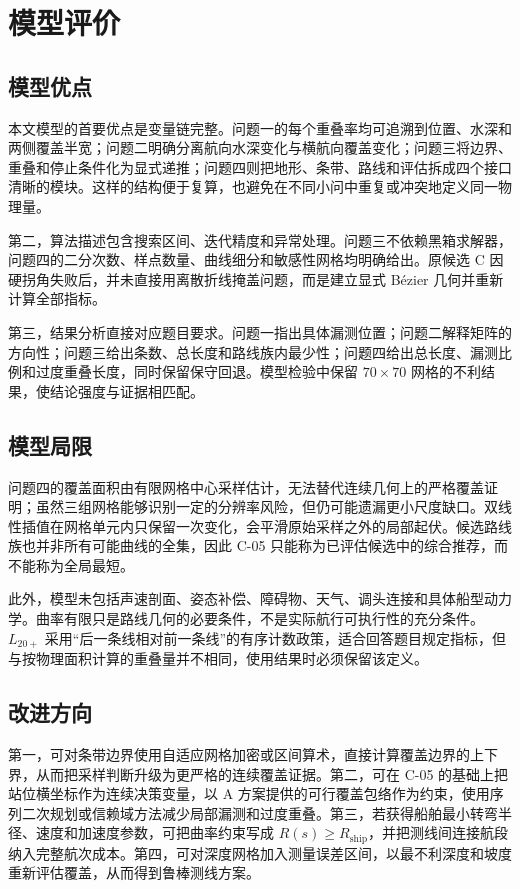 \section{模型评价}
\subsection{模型优点}
本文模型的首要优点是变量链完整。问题一的每个重叠率均可追溯到位置、水深和两侧覆盖半宽；问题二明确分离航向水深变化与横航向覆盖变化；问题三将边界、重叠和停止条件化为显式递推；问题四则把地形、条带、路线和评估拆成四个接口清晰的模块。这样的结构便于复算，也避免在不同小问中重复或冲突地定义同一物理量。

第二，算法描述包含搜索区间、迭代精度和异常处理。问题三不依赖黑箱求解器，问题四的二分次数、样点数量、曲线细分和敏感性网格均明确给出。原候选 C 因硬拐角失败后，并未直接用离散折线掩盖问题，而是建立显式 Bézier 几何并重新计算全部指标。

第三，结果分析直接对应题目要求。问题一指出具体漏测位置；问题二解释矩阵的方向性；问题三给出条数、总长度和路线族内最少性；问题四给出总长度、漏测比例和过度重叠长度，同时保留保守回退。模型检验中保留 $70\times70$ 网格的不利结果，使结论强度与证据相匹配。

\subsection{模型局限}
问题四的覆盖面积由有限网格中心采样估计，无法替代连续几何上的严格覆盖证明；虽然三组网格能够识别一定的分辨率风险，但仍可能遗漏更小尺度缺口。双线性插值在网格单元内只保留一次变化，会平滑原始采样之外的局部起伏。候选路线族也并非所有可能曲线的全集，因此 C-05 只能称为已评估候选中的综合推荐，而不能称为全局最短。

此外，模型未包括声速剖面、姿态补偿、障碍物、天气、调头连接和具体船型动力学。曲率有限只是路线几何的必要条件，不是实际航行可执行性的充分条件。$L_{20+}$ 采用“后一条线相对前一条线”的有序计数政策，适合回答题目规定指标，但与按物理面积计算的重叠量并不相同，使用结果时必须保留该定义。

\subsection{改进方向}
第一，可对条带边界使用自适应网格加密或区间算术，直接计算覆盖边界的上下界，从而把采样判断升级为更严格的连续覆盖证据。第二，可在 C-05 的基础上把站位横坐标作为连续决策变量，以 A 方案提供的可行覆盖包络作为约束，使用序列二次规划或信赖域方法减少局部漏测和过度重叠。第三，若获得船舶最小转弯半径、速度和加速度参数，可把曲率约束写成 $R(s)\ge R_{\mathrm{ship}}$，并把测线间连接航段纳入完整航次成本。第四，可对深度网格加入测量误差区间，以最不利深度和坡度重新评估覆盖，从而得到鲁棒测线方案。

